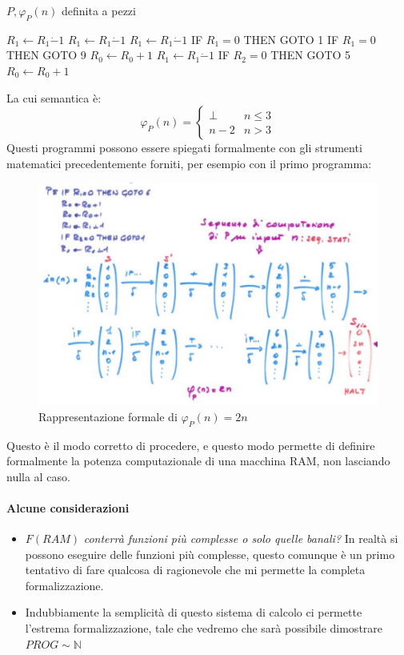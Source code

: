 \documentclass{article}
\begin{document}
\begin{algorithm}[hbt!]
    \caption{$P,\varphi_P(n)$ definita a pezzi}\label{alg:varphi_pieces}
    $R_1\leftarrow R_1\dot{-}1$\;
    $R_1\leftarrow R_1\dot{-}1$\;
    $R_1\leftarrow R_1\dot{-}1$\;
    {IF $R_1=0$ THEN GOTO 1}\;
    {IF $R_1=0$ THEN GOTO 9}\;
    $R_0\leftarrow R_0+1$\;
    $R_1\leftarrow R_1\dot{-}1$\;
    {IF $R_2=0$ THEN GOTO 5}\;
    $R_0\leftarrow R_0+1$\;
\end{algorithm}
La cui semantica è:
\[
    \varphi_P(n)=
    \begin{cases}
        \bot & n\leq 3\\
        n-2 & n>3
    \end{cases}
\]
Questi programmi possono essere spiegati formalmente con gli strumenti matematici precedentemente
forniti, per esempio con il primo programma:
\begin{figure}[H]
    \centering
    \includegraphics[scale=0.4]{images/n_formale.png}
    \caption{Rappresentazione formale di $\varphi_P(n)=2n$}
\end{figure}
Questo è il modo corretto di procedere, e questo modo permette di definire formalmente
la potenza computazionale di una macchina RAM, non lasciando nulla al caso.
\paragraph{Alcune considerazioni}
\begin{itemize}
    \item $F(RAM)$ \textit{conterrà funzioni più complesse o solo quelle banali?} In realtà
          si possono eseguire delle funzioni più complesse, questo comunque è un primo
          tentativo di fare qualcosa di ragionevole che mi permette la completa formalizzazione.
    \item Indubbiamente la semplicità di questo sistema di calcolo ci permette l'estrema
          formalizzazione, tale che vedremo che sarà possibile dimostrare $PROG\sim\mathbb{N}$
\end{itemize}
\end{document}
